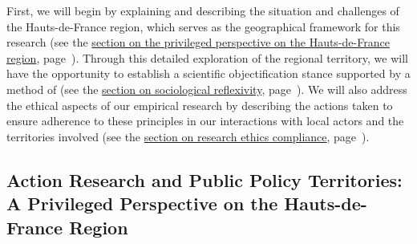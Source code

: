 \begin{refsegment}
First, we will begin by explaining and describing the situation and challenges of the Hauts-de-France region, which serves as the geographical framework for this research (see the \hyperref[chap3:regard-privilegie-region-hdf]{section on the privileged perspective on the Hauts-de-France region}, page~\pageref{chap3:regard-privilegie-region-hdf}). Through this detailed exploration of the regional territory, we will have the opportunity to establish a scientific objectification stance supported by a method of  (see the \hyperref[chap3:auto-analyse-sociologique]{section on sociological reflexivity}, page~\pageref{chap3:auto-analyse-sociologique}). We will also address the ethical aspects of our empirical research by describing the actions taken to ensure adherence to these principles in our interactions with local actors and the territories involved (see the \hyperref[chap3:preparation-terrain-geographique]{section on research ethics compliance}, page~\pageref{chap3:preparation-terrain-geographique}).%

\subsection{Action Research and Public Policy Territories: A Privileged Perspective on the Hauts-de-France Region
    \label{chap3:regard-privilegie-region-hdf}
    }


\end{refsegment}
